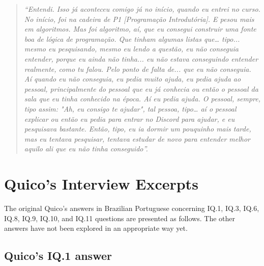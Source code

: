 \begin{quote}
    \itshape
    “Entendi. Isso já aconteceu comigo já no início, quando eu entrei no curso. No início, foi na cadeira de P1 [Programação Introdutória]. E pesou mais em algoritmos. Mas foi algoritmo, aí, que eu consegui construir uma fonte boa de lógica de programação. Que tinham algumas listas que… tipo... mesmo eu pesquisando, mesmo eu lendo a questão, eu não conseguia entender, porque eu ainda não tinha... eu não estava conseguindo entender realmente, como tu falou. Pelo ponto de falta de... que eu não conseguia. Aí quando eu não conseguia, eu pedia muito ajuda, eu pedia ajuda ao pessoal, principalmente do pessoal que eu já conhecia ou então o pessoal da sala que eu tinha conhecido na época. Aí eu pedia ajuda. O pessoal, sempre, tipo assim: "Ah, eu consigo te ajudar", tal pessoa, tipo… aí o pessoal explicar ou então eu pedia para entrar no Discord para ajudar, e eu pesquisava bastante. Então, tipo, eu ia dormir um pouquinho mais tarde, mas eu tentava pesquisar, tentava estudar de novo para entender melhor aquilo ali que eu não tinha conseguido”. 
\end{quote}

\section{Quico’s Interview Excerpts}
\label{interview-exc-sec:quico}

The original Quico's answers in Brazilian Portuguese concerning 
 \gls{IQ}.1, 
 \gls{IQ}.3, 
\gls{IQ}.6, 
\gls{IQ}.8, 
\gls{IQ}.9, 
\gls{IQ}.10, and 
\gls{IQ}.11  
questions are presented as follows. The other answers have not been explored in an appropriate way yet.


 \subsection{Quico’s IQ.1 answer}
 \label{interview-exc-ss:quico-iq1}

